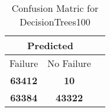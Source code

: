 \begin{table}[] 
\caption{Confusion Matric for DecisionTrees100} 
\label{Table: Prediction Accuracy-NoneDecisionTrees100RandomForest100EKF-ignoresolarPanelDipole100.9EKF-top2-solarPanelDipole} 
\centering 
\begin{tabular} 
 {@{}ccc@{}} 
\toprule 
\multicolumn{2}{c}{\textbf{Predicted}}
 \\ \midrule 
\multicolumn{1}{|c|}{Failure} & 
\multicolumn{1}{c|}{No Failure}
 \\ \midrule 
\multicolumn{1}{|c|}{\color{green}\textbf{63412}} & 
\multicolumn{1}{c|}{\color{red}\textbf{10}}
 \\ \midrule 
\multicolumn{1}{|c|}{\color{red}\textbf{63384}} & 
\multicolumn{1}{c|}{\color{green}\textbf{43322}}
 \\ \bottomrule 
\end{tabular} 
\end{table} 
